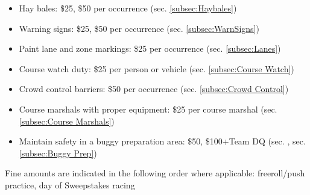 \begin{itemize}
			\item Hay bales: \$25, \$50 per occurrence (sec. \ref{subsec:Haybales})
			
			\item Warning signs: \$25, \$50 per occurrence (sec. \ref{subsec:WarnSigns})

			\item Paint lane and zone markings: \$25 per occurrence (sec. \ref{subsec:Lanes})

			\item Course watch duty: \$25 per person or vehicle (sec. \ref{subsec:Course Watch})

			\item Crowd control barriers: \$50 per occurrence (sec. \ref{subsec:Crowd Control})

			\item Course marshals with proper equipment: \$25 per course marshal (sec. \ref{subsec:Course Marshals})
			
			\item Maintain safety in a buggy preparation area: \$50, \$100+Team DQ (sec. , sec. \ref{subsec:Buggy Prep})

		\end{itemize}

		\noindent Fine amounts are indicated in the following order where applicable: \newline
		freeroll/push practice, day of Sweepstakes racing

